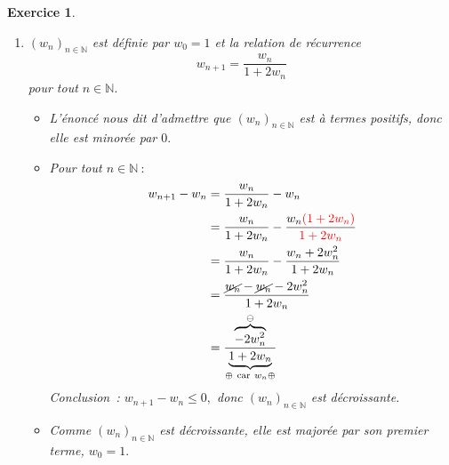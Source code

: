 \documentclass[10pt]{article}
\newtheorem{exo}{Exercice}
\begin{document}
\begin{exo}
\begin{enumerate}
\begin{itemize}
\item[\textbullet] Un carré est positif, donc $\left(v_n\right)_{n\in\mathbb{N}}$ est minorée par $0.$
\item[\textbullet] Soit $M>0.$ La fonction carré est strictement croissante sur $\left[0;+\infty\right[,$ donc \[n> \sqrt{M}\implies n^2> \sqrt{M}^2\implies  u_n> M.\] Le réel $M$ ne peut donc être un majorant. Et comme cela est vrai quel que soit $M,$ la suite $\left(v_n\right)_{n\in\mathbb{N}}$ n'est pas majorée. 
\item[\textbullet] Pour tout $n\in\mathbb{N}~:$
\begin{align*}u_{n+1}-u_{n}&=(n+1)^2-n^2
\\&=\cancel{n^2}+2n+1-\cancel{n^2}
\\&=\underbrace{2n+1}_{\oplus}
\end{align*}
Conclusion~: $u_{n+1}-u_{n}\geq 0,$ donc $\left(u_n\right)_{n\in\mathbb{N}}$ est croissante.
\end{itemize}
\item $(w_n)_{n\in\mathbb{N}}$ est définie par $w_0=1$ et la relation de récurrence \[w_{n+1}=\dfrac{w_n}{1+2w_n}\] pour tout $n\in\mathbb{N}.$


\begin{itemize}
\item[\textbullet] L'énoncé nous dit d'admettre que $(w_n)_{n\in\mathbb{N}}$ est à termes positifs, donc elle est minorée par $0.$
\item[\textbullet] Pour tout $n\in\mathbb{N}~:$
\begin{align*}w_{n+1}-w_{n}&=\dfrac{w_n}{1+2w_n}-w_n
\\&=\dfrac{w_n}{1+2w_n}-\dfrac{w_n\textcolor{red}{\left(1+2w_n\right)}}{\textcolor{red}{1+2w_n}}
\\&=\dfrac{w_n}{1+2w_n}-\dfrac{w_n+2w_n^2}{1+2w_n}
\\&=\dfrac{\cancel{w_n}-\cancel{w_n}-2w_n^2}{1+2w_n}
\\&=\dfrac{\overbrace{-2w_n^2}^{\ominus}}{\underbrace{1+2w_n}_{\oplus~\text{car}~w_n\oplus}}
\end{align*}
Conclusion~: $w_{n+1}-w_{n}\leq 0,$ donc $\left(w_n\right)_{n\in\mathbb{N}}$ est décroissante.
\item[\textbullet] Comme $\left(w_n\right)_{n\in\mathbb{N}}$ est décroissante, elle est majorée par son premier terme, $w_0=1.$
\end{itemize}
\end{enumerate}

\end{exo}
\end{document}
